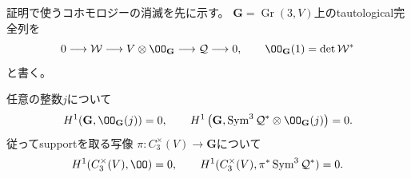 証明で使うコホモロジーの消滅を先に示す。
$\mathbf G=\operatorname{Gr}(3,V)$上のtautological完全列を
\begin{equation}
 0\longrightarrow\mathcal W\longrightarrow V\otimes\OO_{\mathbf G}
 \longrightarrow\mathcal Q\longrightarrow0,\qquad
 \OO_{\mathbf G}(1)=\det\mathcal W^*
 \label{eq:pg-rank-two-tautological-sequence}
\end{equation}
と書く。

\begin{lemma}[中心三次束の一次コホモロジー]
\label{lem:pg-rank-two-bott-vanishing}
任意の整数$j$について
\begin{equation}
 H^1(\mathbf G,\OO_{\mathbf G}(j))=0,\qquad
 H^1\left(\mathbf G,
 \operatorname{Sym}^3\mathcal Q^*\otimes\OO_{\mathbf G}(j)\right)=0.
 \label{eq:pg-rank-two-bott-vanishing}
\end{equation}
従ってsupportを取る写像
$\pi:C_3^\times(V)\to\mathbf G$について
\begin{equation}
 H^1(C_3^\times(V),\OO)=0,\qquad
 H^1(C_3^\times(V),\pi^*\operatorname{Sym}^3\mathcal Q^*)=0.
 \label{eq:pg-rank-two-cone-cohomology}
\end{equation}
\end{lemma}
